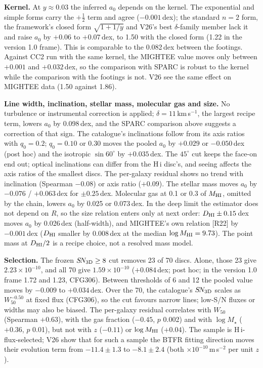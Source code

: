 \documentclass[10pt]{article}
\begin{document}
\textbf{Kernel.} At $y\approx0.03$ the inferred $a_0$ depends on the kernel. The exponential and simple forms carry the $+\tfrac12$ term and agree ($-0.001$\,dex); the standard $n=2$ form, the framework's closed form $\sqrt{1+1/y}$ and V26's best $\delta$-family member lack it and raise $a_0$ by $+0.06$ to $+0.07$\,dex, to 1.50 with the closed form (1.22 in the version 1.0 frame). This is comparable to the 0.082\,dex between the footings. Against CC2 run with the same kernel, the MIGHTEE value moves only between $+0.001$ and $+0.032$\,dex, so the comparison with SPARC is robust to the kernel while the comparison with the footings is not. V26 see the same effect on MIGHTEE data (1.50 against 1.86).

\textbf{Line width, inclination, stellar mass, molecular gas and size.} No turbulence or instrumental correction is applied; $\delta=11$\,km\,s$^{-1}$, the largest recipe term, lowers $a_0$ by 0.098\,dex, and the SPARC comparison above suggests a correction of that sign. The catalogue's inclinations follow from its axis ratios with $q_0=0.2$; $q_0=0.10$ or 0.30 moves the pooled $a_0$ by $+0.029$ or $-0.050$\,dex (post hoc) and the isotropic $\sin60^\circ$ by $+0.035$\,dex. The $45^\circ$ cut keeps the face-on end out; optical inclinations can differ from the H\,{\sc i} disc's, and seeing affects the axis ratios of the smallest discs. The per-galaxy residual shows no trend with inclination (Spearman $-0.08$) or axis ratio ($+0.09$). The stellar mass moves $a_0$ by $-0.076$ / $+0.063$\,dex for $\pm0.25$\,dex. Molecular gas at 0.1 or 0.3 of $M_{\rm HI}$, omitted by the chain, lowers $a_0$ by 0.025 or 0.073\,dex. In the deep limit the estimator does not depend on $R$, so the size relation enters only at next order: $D_{\rm HI}\pm0.15$\,dex moves $a_0$ by 0.026\,dex (half-width), and MIGHTEE's own relation [R22] by $-0.001$\,dex ($D_{\rm HI}$ smaller by 0.008\,dex at the median $\log M_{\rm HI}=9.73$). The point mass at $D_{\rm HI}/2$ is a recipe choice, not a resolved mass model.

\textbf{Selection.} The frozen $S\!N_{\rm 3D}\ge8$ cut removes 23 of 70 discs. Alone, those 23 give $2.23\times10^{-10}$, and all 70 give $1.59\times10^{-10}$ ($+0.084$\,dex; post hoc; in the version 1.0 frame 1.72 and 1.23, CFG306). Between thresholds of 6 and 12 the pooled value moves by $-0.009$ to $+0.034$\,dex. Over the 70, the catalogue's $S\!N_{\rm 3D}$ scales as $W_{50}^{-0.50}$ at fixed flux (CFG306), so the cut favours narrow lines; low-S/N fluxes or widths may also be biased. The per-galaxy residual correlates with $W_{50}$ (Spearman $+0.63$), with the gas fraction ($-0.45$, $p$ 0.002) and with $\log M_\star$ ($+0.36$, $p$ 0.01), but not with $z$ ($-0.11$) or $\log M_{\rm HI}$ ($+0.04$). The sample is H\,{\sc i}-flux-selected; V26 show that for such a sample the BTFR fitting direction moves their evolution term from $-11.4\pm1.3$ to $-8.1\pm2.4$ (both $\times10^{-10}$\,m\,s$^{-2}$ per unit $z$).
\end{document}
